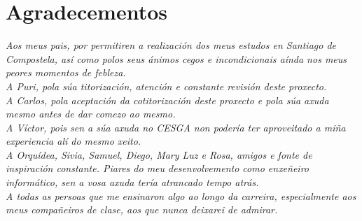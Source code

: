 \pagestyle{plain}
\chapter*{Agradecementos}

\textit{Aos meus pais, por permitiren a realización dos meus estudos en Santiago de Compostela, así como polos seus ánimos cegos e incondicionais aínda nos meus peores momentos de febleza.}\\

\textit{A Puri, pola súa titorización, atención e constante revisión deste proxecto.}\\

\textit{A Carlos, pola aceptación da cotitorización deste proxecto e pola súa axuda mesmo antes de dar comezo ao mesmo.}\\

\textit{A Víctor, pois sen a súa axuda no CESGA non podería ter aproveitado a miña experiencia alí do mesmo xeito.}\\

\textit{A Orquídea, Sivia, Samuel, Diego, Mary Luz e Rosa, amigos e fonte de inspiración constante. Piares do meu desenvolvemento como enxeñeiro informático, sen a vosa axuda tería atrancado tempo atrás.}\\

\textit{A todas as persoas que me ensinaron algo ao longo da carreira, especialmente aos meus compañeiros de clase, aos que nunca deixarei de admirar.}
